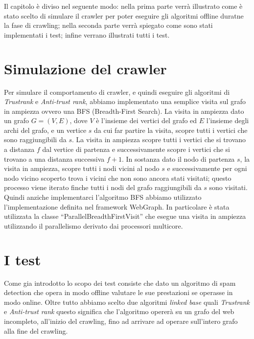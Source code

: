 Il capitolo è diviso nel seguente modo: nella prima parte verrà illustrato come è stato scelto di simulare il crawler per poter eseguire gli algoritmi offline duratne la fase di crawling; nella seconda parte verrà spiegato come sono stati implementati i test; infine verrano illustrati tutti i test.

\section{Simulazione del crawler}
Per simulare il comportamento di crawler, e quindi eseguire gli algoritmi di \textit{Trustrank} e \textit{Anti-trust rank}, abbiamo implementato una semplice visita sul grafo in ampiezza ovvero una BFS \cite{bfsCormen} (Breadth-First Search). La visita in ampiezza dato un grafo \(G=(V,E)\), dove \(V\) è l'insieme dei vertici del grafo ed \(E\) l'insieme degli archi del grafo, e un vertice \(s\) da cui far partire la visita, scopre tutti i vertici che sono raggiungibili da \(s\). La visita in ampiezza scopre tutti i vertici che si trovano a distanza \(f\) dal vertice di partenza e successivamente scopre i vertici che si trovano a una distanza successiva \(f+1\). In sostanza dato il nodo di partenza \(s\), la visita in ampiezza, scopre tutti i nodi vicini al nodo \(s\) e successivamente per ogni nodo vicino scoperto trova i vicini che non sono ancora stati visitati; questo processo viene iterato finche tutti i nodi del grafo raggiungibili da \(s\) sono visitati. \\
Quindi anziche implementarci l'algoritmo BFS abbiamo utilizzato l'implementazione definita nel framework WebGraph. In particolare è stata utilizzata la classe ``ParallelBreadthFirstVisit'' che esegue una visita in ampiezza utilizzando il parallelismo derivato dai processori multicore.

\section{I test}
Come gia introdotto lo scopo dei test consiste che dato un algoritmo di spam detection che opera in modo offline valutare le sue prestazioni se operasse in modo online. Oltre tutto abbiamo scelto due algoritmi \textit{linked base} quali \textit{Trustrank} e \textit{Anti-trust rank} questo significa che l'algoritmo opererà su un grafo del web incompleto, all'inizio del crawling, fino ad arrivare ad operare sull'intero grafo alla fine del crawling.

